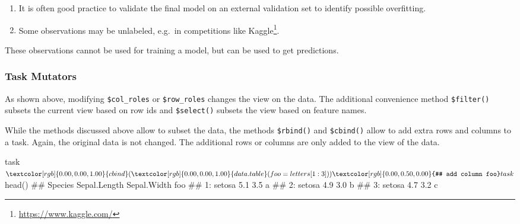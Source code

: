 \documentclass[12pt,]{scrbook}
\newenvironment{Shaded}{}{}
\newcommand{\CommentTok}[1]{\textcolor[rgb]{0.00,0.50,0.00}{#1}}
\newcommand{\DataTypeTok}[1]{#1}
\newcommand{\DecValTok}[1]{#1}
\newcommand{\KeywordTok}[1]{\textcolor[rgb]{0.00,0.00,1.00}{#1}}
\newcommand{\NormalTok}[1]{#1}
\newcommand{\OperatorTok}[1]{#1}
\newcommand{\StringTok}[1]{\textcolor[rgb]{0.00,0.50,0.50}{#1}}
\providecommand{\tightlist}{%
  \setlength{\itemsep}{0pt}\setlength{\parskip}{0pt}}
\renewcommand{\href}[2]{#2\footnote{\url{#1}}}
\begin{document}
\begin{enumerate}
\def\labelenumi{\arabic{enumi}.}
\tightlist
\item
  It is often good practice to validate the final model on an external validation set to identify possible overfitting.
\item
  Some observations may be unlabeled, e.g.~in competitions like \href{https://www.kaggle.com/}{Kaggle}.
\end{enumerate}

These observations cannot be used for training a model, but can be used to get predictions.

\hypertarget{tasks-mutators}{%
\subsubsection{Task Mutators}\label{tasks-mutators}}

As shown above, modifying \texttt{\$col\_roles} or \texttt{\$row\_roles} changes the view on the data.
The additional convenience method \texttt{\$filter()} subsets the current view based on row ids and \texttt{\$select()} subsets the view based on feature names.

\begin{Shaded}
\end{Shaded}

While the methods discussed above allow to subset the data, the methods \texttt{\$rbind()} and \texttt{\$cbind()} allow to add extra rows and columns to a task.
Again, the original data is not changed.
The additional rows or columns are only added to the view of the data.

\begin{Shaded}
\begin{Highlighting}[]
\NormalTok{task}\OperatorTok{$}\KeywordTok{cbind}\NormalTok{(}\KeywordTok{data.table}\NormalTok{(}\DataTypeTok{foo =}\NormalTok{ letters[}\DecValTok{1}\OperatorTok{:}\DecValTok{3}\NormalTok{]))  }\CommentTok{# add column foo}
\NormalTok{task}\OperatorTok{$}\KeywordTok{head}\NormalTok{()}
\NormalTok{##    Species Sepal.Length Sepal.Width foo}
\NormalTok{## 1:  setosa          5.1         3.5   a}
\NormalTok{## 2:  setosa          4.9         3.0   b}
\NormalTok{## 3:  setosa          4.7         3.2   c}
\end{Highlighting}
\end{Shaded}
\end{document}
